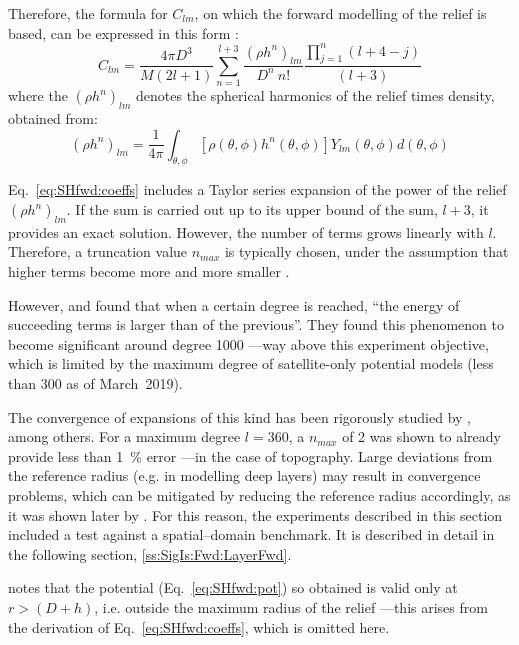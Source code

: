 Therefore, the formula for $C_{lm}$, on which the forward modelling of the relief is based, can be expressed in this form \parencite{Wieczorek2007}:
\begin{equation}
    \label{eq:SHfwd:coeffs}
    C_{lm} =
    \frac{4 \pi D^3}{M(2l+1)}
    \sum_{n=1}^{l+3}
    \frac{(\rho h^n)_{lm}}{D^n \ n!}
    \frac{\prod_{j=1}^{n}(l+4-j)}{(l+3)}
\end{equation}
where the $(\rho h^n)_{lm}$ denotes the spherical harmonics of the relief times density, obtained from:
\begin{equation}
    \label{eq:SHfwd:reliefSH}
    (\rho h^n)_{lm} =
    \frac{1}{4 \pi}
    \int_{\theta, \phi}
    \left[ \rho(\theta, \phi) h^n(\theta, \phi) \right]
    Y_{lm}(\theta, \phi) d(\theta, \phi)
\end{equation}

Eq.~\ref{eq:SHfwd:coeffs} includes a Taylor series expansion of the power of the relief $(\rho h^n)_{lm}$.
If the sum is carried out up to its upper bound of the sum, $l+3$, it provides an exact solution.
However, the number of terms grows linearly with $l$.
Therefore, a truncation value $n_{max}$ is typically chosen, under the assumption that higher terms become more and more smaller \parencite{Wieczorek2007}.

However, \textcite{Balmino2012} and \textcite{Hirt2017} found that when a certain degree is reached, ``the energy of succeeding terms is larger than of the previous''.
They found this phenomenon to become significant around degree \num{1000} ---way above this experiment objective, which is limited by the maximum degree of satellite-only potential models (less than \num{300} as of March~2019).

The convergence of expansions of this kind has been rigorously studied by \textcite{Sun2001}, among others.
For a maximum degree $l = \num{360}$, a $n_{max}$ of \num{2} was shown to already provide less than \SI{1}{\percent} error ---in the case of topography.
Large deviations from the reference radius (e.g. in modelling deep layers) may result in convergence problems, which can be mitigated by reducing the reference radius accordingly, as it was shown later by \textcite{Root2015}.
For this reason, the experiments described in this section included a test against a spatial--domain benchmark.
It is described in detail in the following section, \ref{ss:SigIs:Fwd:LayerFwd}.

\Textcite{Wieczorek2007} notes that the potential (Eq.~\ref{eq:SHfwd:pot}) so obtained is valid only at $r > (D + h)$, i.e. outside the maximum radius of the relief ---this arises from the derivation of Eq.~\ref{eq:SHfwd:coeffs}, which is omitted here.

